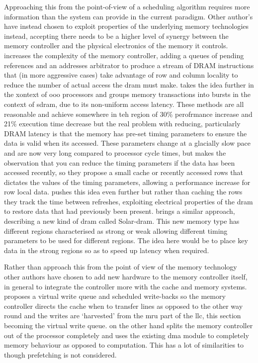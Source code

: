 Approaching this from the point-of-view of a scheduling algorithm requires more information than the system can provide in the current paradigm. Other author's have instead chosen to exploit properties of the underlying memory technologies instead, accepting there needs to be a higher level of synergy between the memory controller and the physical electronics of the memory it controls. \citet{rixnerMemoryAccessScheduling2000a} increases the complexity of the memory controller, adding a queues of pending references and an addresses arbitrator to produce a stream of DRAM instructions that (in more aggressive cases) take advantage of row and column locality to reduce the number of actual access the \gls{dram} must make. \citet{shaoBurstSchedulingAccess2007} takes the idea further in the xontext of \gls{ooo} processors and groups memory transactions into bursts in the context of \gls{sdram}, due to its non-uniform access latency. These methods are all reasonable and achieve somewhere in teh region of 30\% perofrmance increase \cite{rixnerMemoryAccessScheduling2000a} and 21\% execution time decrease \cite{shaoBurstSchedulingAccess2007} but the real problem with reducing, particularly DRAM latency is that the memory has pre-set timing parameters to ensure the data is valid when its accessed. These parameters change at a glacially slow pace and are now very long compared to processor cycle times, but \citet{hassanChargeCacheReducingDRAM2016} makes the observation that you can reduce the timing parameters if the data has been accessed recently, so they propose a small cache or recently accessed rows that dictates the values of the timing parameters, allowing a performance increase for row local data. \citet{shinDRAMLatencyOptimizationInspired2016} pushes this idea even further but rather than caching the rows they track the time between refreshes, exploiting electrical properties of the \gls{dram} to restore data that had previously been present. \citet{kimSolarDRAMReducingDRAM2018} brings a similar approach, describing a new kind of \gls{dram} called Solar-\gls{dram}. This new memory type has different regions characterised as strong or weak allowing different timing parameters to be used for different regions. The idea here would be to place key data in the strong regions so as to speed up latency when required. 

Rather than approach this from the point of view of the memory technology other authors have chosen to add new hardware to the memory controller itself, in general to integrate the controller more with the cache and memory systems. \citet{stuecheliCoordinatingDRAMLastLevelCache2011} proposes a virtual write queue and scheduled write-backs so the memory controller directs the cache when to transfer lines as opposed to the other way round and the writes are `harvested' from the \gls{mru} part of the \gls{llc}, this section becoming the virtual write queue. \citet{waslyHidingMemoryLatency2014} on the other hand splits the memory controller out of the processor completely and uses the existing \gls{dma} module to completely memory behaviour as opposed to computation. This has a lot of similarities to \citet{veidenbaumDecoupledAccessDRAM1997} though prefetching is not considered.

